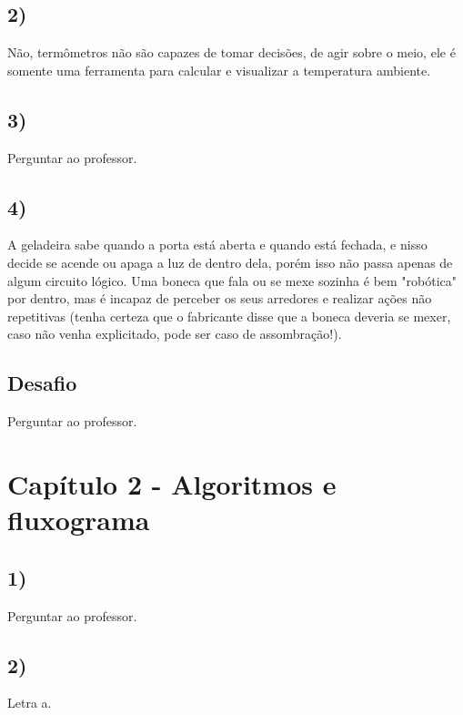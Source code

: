      \subsection*{2)}
        Não, termômetros não são capazes de tomar decisões, de agir sobre o meio, ele é somente uma ferramenta para calcular e visualizar a temperatura ambiente.
        
    \subsection*{3)} Perguntar ao professor.
        
    \subsection*{4)}
        A geladeira sabe quando a porta está aberta e quando está fechada, e nisso decide se acende ou apaga a luz de dentro dela, porém isso não passa apenas de algum circuito lógico. Uma boneca que fala ou se mexe sozinha é bem "robótica" por dentro, mas é incapaz de perceber os seus arredores e realizar ações não repetitivas (tenha certeza que o fabricante disse que a boneca deveria se mexer, caso não venha explicitado, pode ser caso de assombração!).
        
    \subsection*{\textbf{Desafio}}
        Perguntar ao professor.
        

\section*{Capítulo 2 - Algoritmos e fluxograma}

    \subsection*{1)} Perguntar ao professor.
    
    \subsection*{2)} Letra a.
    
